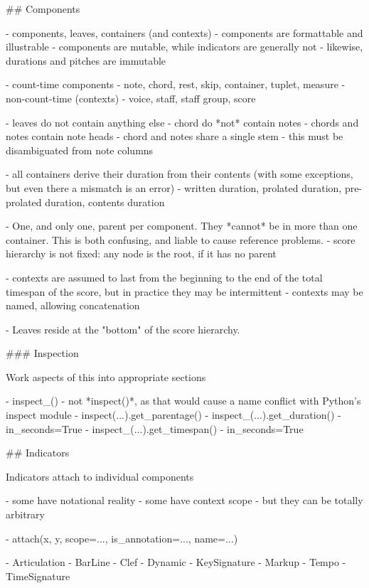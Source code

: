 \begin{markdown}

## Components

-   components, leaves, containers (and contexts)
-   components are formattable and illustrable
-   components are mutable, while indicators are generally not
    -   likewise, durations and pitches are immutable

-   count-time components
    -   note, chord, rest, skip, container, tuplet, measure
-   non-count-time (contexts)
    -   voice, staff, staff group, score

-   leaves do not contain anything else
    -   chord do *not* contain notes
    -   chords and notes contain note heads
    -   chord and notes share a single stem
    -   this must be disambiguated from note columns

-   all containers derive their duration from their contents (with some
    exceptions, but even there a mismatch is an error)
-   written duration, prolated duration, pre-prolated duration, contents
    duration

-   One, and only one, parent per component. They *cannot* be in more than one
    container. This is both confusing, and liable to cause reference problems.
-   score hierarchy is not fixed: any node is the root, if it has no parent

-   contexts are assumed to last from the beginning to the end of the total
    timespan of the score, but in practice they may be intermittent
-   contexts may be named, allowing concatenation

-   Leaves reside at the "bottom" of the score hierarchy.

### Inspection

Work aspects of this into appropriate sections

-   inspect_()
-   not *inspect()*, as that would cause a name conflict with Python's inspect
    module
-   inspect(...).get_parentage()
-   inspect_(...).get_duration()
    -   in_seconds=True
-   inspect_(...).get_timespan()
    -   in_seconds=True

## Indicators

Indicators attach to individual components

-   some have notational reality
-   some have context scope
-   but they can be totally arbitrary

-   attach(x, y, scope=..., is_annotation=..., name=...)

-   Articulation
-   BarLine
-   Clef
-   Dynamic
-   KeySignature
-   Markup
-   Tempo
-   TimeSignature


\end{markdown}
